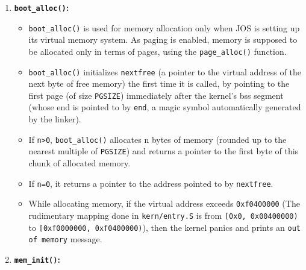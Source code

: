 \documentclass[]{article}
\begin{document}
\begin{enumerate}
\def\labelenumi{\arabic{enumi}.}
\itemsep1pt\parskip0pt
\item
  \textbf{\texttt{boot\_alloc()}:}

  \begin{itemize}
  \itemsep1pt\parskip0pt
  \item
    \texttt{boot\_alloc()} is used for memory allocation only when JOS
    is setting up its virtual memory system. As paging is enabled,
    memory is supposed to be allocated only in terms of pages, using the
    \texttt{page\_alloc()} function.
  \item
    \texttt{boot\_alloc()} initializes \texttt{nextfree} (a pointer to
    the virtual address of the next byte of free memory) the first time
    it is called, by pointing to the first page (of size
    \texttt{PGSIZE}) immediately after the kernel's bss segment (whose
    end is pointed to by \texttt{end}, a magic symbol automatically
    generated by the linker).
  \item
    If \texttt{n\textgreater{}0}, \texttt{boot\_alloc()} allocates n
    bytes of memory (rounded up to the nearest multiple of
    \texttt{PGSIZE}) and returns a pointer to the first byte of this
    chunk of allocated memory.
  \item
    If \texttt{n=0}, it returns a pointer to the address pointed to by
    \texttt{nextfree}.
  \item
    While allocating memory, if the virtual address exceeds
    \texttt{0xf0400000} (The rudimentary mapping done in
    \texttt{kern/entry.S} is from \texttt{{[}0x0, 0x00400000)} to
    \texttt{{[}0xf0000000, 0xf0400000)}), then the kernel panics and
    prints an \texttt{out of memory} message.
  \end{itemize}
\item
  \textbf{\texttt{mem\_init()}:}


\end{enumerate}
\end{document}

